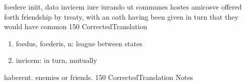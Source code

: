 \latline
  {foedere iniit, dato invicem iure iurando ut communes hostes amicosve}
  { offered forth friendship by treaty, with an oath having been given in turn that they would have common }
  {150}
  { CorrectedTranslation }
  { \begin{enumerate}
  	\item foedus, foederis, n:  league between states
  	\item invicem:  in turn, mutually
  \end{enumerate} }


\latline
  {haberent.}
  { enemies or friends. }
  {150}
  { CorrectedTranslation }
  { Notes }


